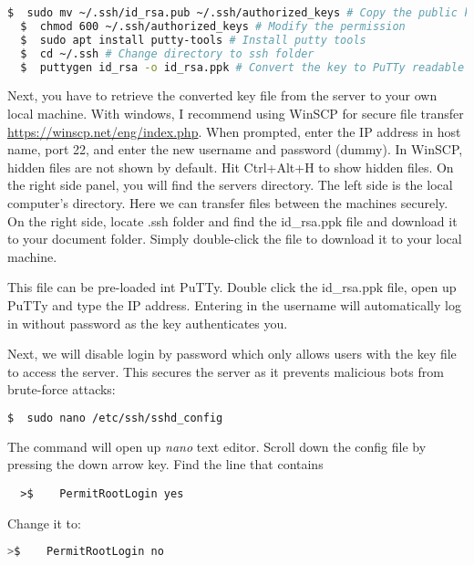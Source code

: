 \begin{lstlisting}[language=bash]
  $  sudo mv ~/.ssh/id_rsa.pub ~/.ssh/authorized_keys # Copy the public key
  $  chmod 600 ~/.ssh/authorized_keys # Modify the permission
  $  sudo apt install putty-tools # Install putty tools
  $  cd ~/.ssh # Change directory to ssh folder
  $  puttygen id_rsa -o id_rsa.ppk # Convert the key to PuTTy readable file

\end{lstlisting}

\noindent
Next, you have to retrieve the converted key file from the server to your own local machine. With windows, I recommend using WinSCP for secure file transfer \url{https://winscp.net/eng/index.php}. When prompted, enter the IP address in host name, port 22, and enter the new username and password (dummy). In WinSCP, hidden files are not shown by default. Hit Ctrl+Alt+H to show hidden files. On the right side panel, you will find the servers directory. The left side is the local computer's directory. Here we can transfer files between the machines securely. On the right side, locate .ssh folder and find the id\_rsa.ppk file and download it to your document folder. Simply double-click the file to download it to your local machine.

\noindent
This file can be pre-loaded int PuTTy. Double click the id\_rsa.ppk file, open up PuTTy and type the IP address. Entering in the username will automatically log in without password as the key authenticates you.

\noindent
Next, we will disable login by password which only allows users with the key file to access the server. This secures the server as it prevents malicious bots from brute-force attacks:

\begin{lstlisting}[language=bash]
  $  sudo nano /etc/ssh/sshd_config
\end{lstlisting}

\noindent
The command will open up \emph{nano} text editor. Scroll down the config file by pressing the down arrow key. Find the line that contains

\begin{lstlisting}
  >$    PermitRootLogin yes
\end{lstlisting}

\noindent
Change it to:

\begin{lstlisting}[language=bash]
  >$    PermitRootLogin no
\end{lstlisting}

